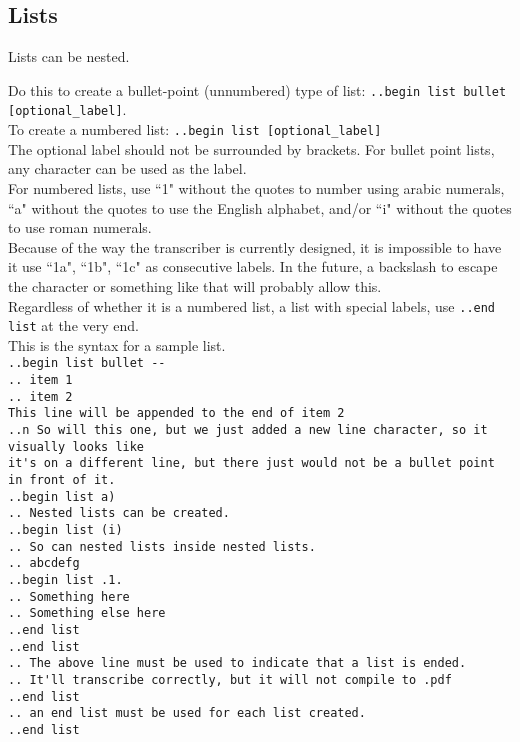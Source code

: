 \documentclass[12pt]{article}
\newcommand{\nl}{\\}
\begin{document}
\begin{flushleft}
\section*{Lists}

Lists can be nested.

Do this to create a bullet-point (unnumbered) type of list: \verb|..begin list bullet [optional_label]|.\nl
To create a numbered list: \verb|..begin list [optional_label]|\nl
The optional label should not be surrounded by brackets. For bullet point lists, any character can be used as the label. \nl
For numbered lists, use ``1" without the quotes to number using arabic numerals, ``a" without the quotes to use the English alphabet, and/or ``i" without the quotes to use roman numerals. \nl
Because of the way the transcriber is currently designed, it is impossible to have it use ``1a", ``1b", ``1c" as consecutive labels. In the future, a backslash to escape the character or something like that will probably allow this. \nl
Regardless of whether it is a numbered list, a list with special labels, use \verb|..end list| at the very end. \nl
\bigskip
This is the syntax for a sample list. \nl
\verb|..begin list bullet --|\nl
\verb|.. item 1|\nl
\verb|.. item 2|\nl
\verb|This line will be appended to the end of item 2|\nl
\verb|..n So will this one, but we just added a new line character, so it visually looks like|\nl
\verb|it's on a different line, but there just would not be a bullet point in front of it.|\nl
\verb|..begin list a)|\nl
\verb|.. Nested lists can be created.|\nl
\verb|..begin list (i)|\nl
\verb|.. So can nested lists inside nested lists.|\nl
\verb|.. abcdefg|\nl
\verb|..begin list .1.|\nl
\verb|.. Something here|\nl
\verb|.. Something else here|\nl
\verb|..end list|\nl
\verb|..end list|\nl
\verb|.. The above line must be used to indicate that a list is ended.|\nl
\verb|.. It'll transcribe correctly, but it will not compile to .pdf|\nl
\verb|..end list|\nl
\verb|.. an end list must be used for each list created.|\nl
\verb|..end list|\nl
\bigskip


\end{flushleft}
\end{document}
